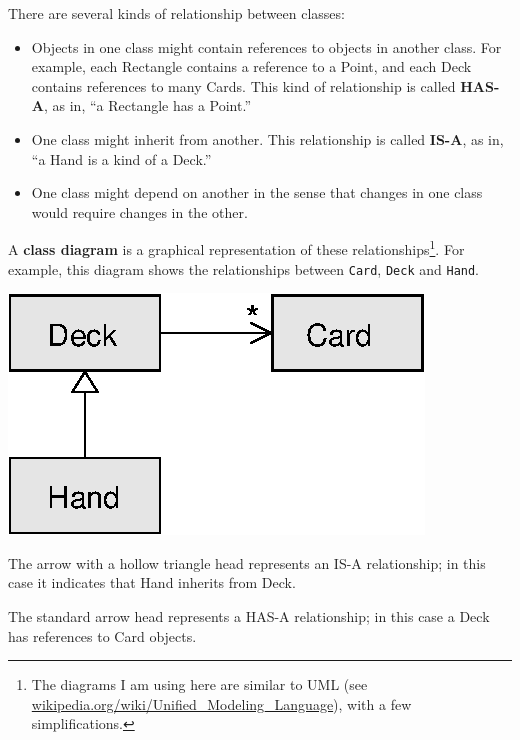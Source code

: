 \documentclass[10pt]{book}
\begin{document}
{There are several kinds of relationship between classes:

\begin{itemize}

\item Objects in one class might contain references to objects
in another class.  For example, each Rectangle contains a reference
to a Point, and each Deck contains references to many Cards.
This kind of relationship is called {\bf HAS-A}, as in, ``a Rectangle
has a Point.''

\item One class might inherit from another.  This relationship
is called {\bf IS-A}, as in, ``a Hand is a kind of a Deck.''

\item One class might depend on another in the sense that changes
in one class would require changes in the other.

\end{itemize}


A {\bf class diagram} is a graphical representation of these
relationships\footnote{The diagrams I am using here are similar to UML
  (see \url{wikipedia.org/wiki/Unified_Modeling_Language}), with a few
  simplifications.}.  For example, this diagram shows the
relationships between {\tt Card}, {\tt Deck} and {\tt Hand}.

\beforefig
\centerline{\includegraphics{figs/class1.eps}}
\afterfig

The arrow with a hollow triangle head represents an IS-A
relationship; in this case it indicates that Hand inherits
from Deck.

The standard arrow head represents a HAS-A
relationship; in this case a Deck has references to Card
objects.

}
\end{document}

